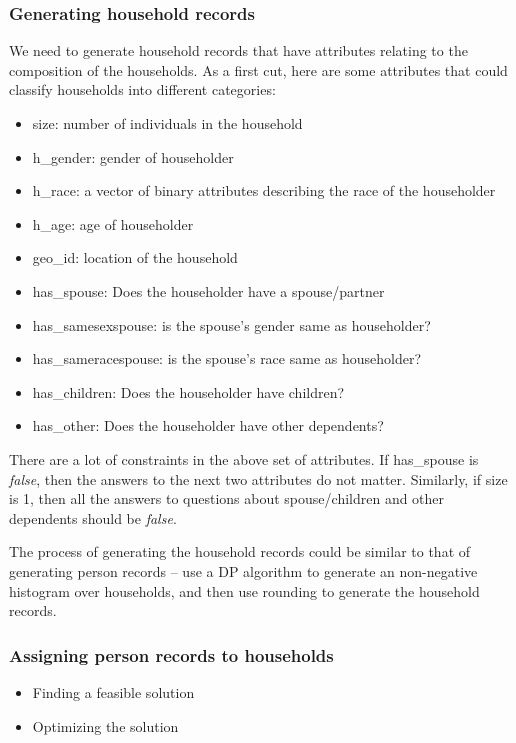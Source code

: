 \documentclass{amsart}
\begin{document}
{\subsubsection{Generating household records}
We need to generate household records that have attributes relating to the composition of the households. As a first cut, here are some attributes that could classify households into different categories: 
\begin{itemize}
\item size: number of individuals in the household
\item h\_gender: gender of householder
\item h\_race: a vector of binary attributes describing the race of the householder
\item h\_age: age of householder
\item geo\_id: location of the household
\item has\_spouse: Does the householder have a spouse/partner
\item has\_samesexspouse: is the spouse's gender same as householder?
\item has\_sameracespouse: is the spouse's race same as householder? 
\item has\_children: Does the householder have children?
\item has\_other: Does the householder have other dependents?
\end{itemize}


There are a lot of constraints in the above set of attributes. If has\_spouse is \emph{false}, then the answers to the next two attributes do not matter. Similarly, if size is 1, then all the answers to questions about spouse/children and other dependents should be \emph{false}. 

The process of generating the household records could be similar to that of generating person records -- use a DP algorithm to generate an non-negative histogram over households, and then use rounding to generate the household records. 

\subsubsection{Assigning person records to households}
\begin{itemize}
\item Finding a feasible solution
\item Optimizing the solution
\end{itemize}

}
\end{document}
